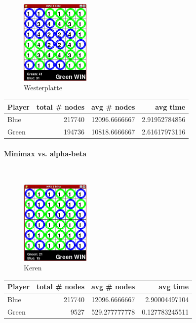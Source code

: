 \begin{multicols*}{2}
\begin{figure}[H]
\centering
\includegraphics[width=0.3\textwidth]{graphics/mm_westerplatte.png}
\caption{Westerplatte}
\end{figure}
\begin{tabular}{l|r|r|r}
  Player & total \# nodes & avg \# nodes & avg time \\
  \hline
  Blue & 217740 & 12096.6666667 & 2.91952784856 \\
  Green & 194736 & 10818.6666667 & 2.61617973116 \\
\end{tabular}

\columnbreak
\paragraph*{Minimax vs. alpha-beta}
\mbox{}\\
\begin{figure}[H]
\centering
\includegraphics[width=0.3\textwidth]{graphics/ma_keren.png}
\caption{Keren}
\end{figure}
\begin{tabular}{l|r|r|r}
  Player & total \# nodes & avg \# nodes & avg time \\
  \hline
  Blue & 217740 & 12096.6666667 & 2.90004497104 \\
  Green & 9527 & 529.277777778 & 0.127783245511 \\
\end{tabular}


\end{multicols*}

